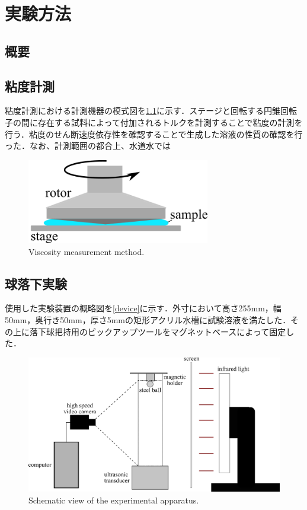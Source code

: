 \chapter{実験方法}
\section{概要}
\section{粘度計測}
粘度計測における計測機器の模式図を\ref{fig:viscosity}に示す．ステージと回転する円錐回転子の間に存在する試料によって付加されるトルクを計測することで粘度の計測を行う．粘度のせん断速度依存性を確認することで生成した溶液の性質の確認を行った．なお、計測範囲の都合上、水道水では

\begin{center}
    \begin{figure}[h]
        \includegraphics[clip,width=8.0cm]{2-Methods/Viscosity-Measurement.png}
        \caption{Viscosity measurement method.}
        \label{fig:viscosity}
    \end{figure}
\end{center}

\section{球落下実験}

使用した実験装置の概略図を\ref{device}に示す．外寸において高さ255mm，幅50mm，奥行き50mm，厚さ5mmの矩形アクリル水槽に試験溶液を満たした．その上に落下球把持用のピックアップツールをマグネットベースによって固定した．
\begin{center}
    \begin{figure}[H]
        \includegraphics[clip,width=15.0cm]{2-Methods/device.png}
        \caption{Schematic view of the experimental apparatus.}
        \label{fig:device}
    \end{figure}
\end{center}
